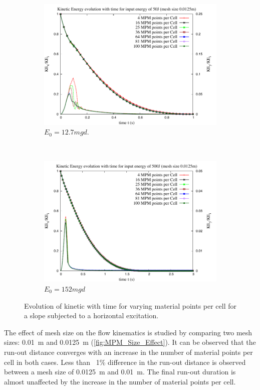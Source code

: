 \begin{figure}[tbhp]
\centering
\begin{subfigure}[b]{0.95\textwidth}
\includegraphics[width=\textwidth]{KE_50}
\caption{$E_0=12.7mgd$.}
\label{fig:KE_50}
\end{subfigure}
\\
\begin{subfigure}[b]{0.95\textwidth}
\centering
\includegraphics[width=\textwidth]{KE_500}
\caption{$E_0=152mgd$}
\label{fig:KE_500}
\end{subfigure}
\caption{Evolution of kinetic with time for varying material points per cell 
for a slope subjected to a horizontal excitation.}
\label{fig:KE_MPM}
\end{figure}

The effect of mesh size on the flow kinematics is studied by comparing two mesh 
sizes: 0.01~\si{\m} and 0.0125~\si{\m} (\cref{fig:MPM_Size_Effect}). It can 
be observed that the run-out distance converges with an increase in the number 
of material points per cell in both cases. Less than ~1\% difference in the 
run-out distance is observed between a mesh size of 0.0125~\si{\m} and 
0.01~\si{\m}. The final run-out duration is almost unaffected by the increase 
in the number of material points per cell. 
 

